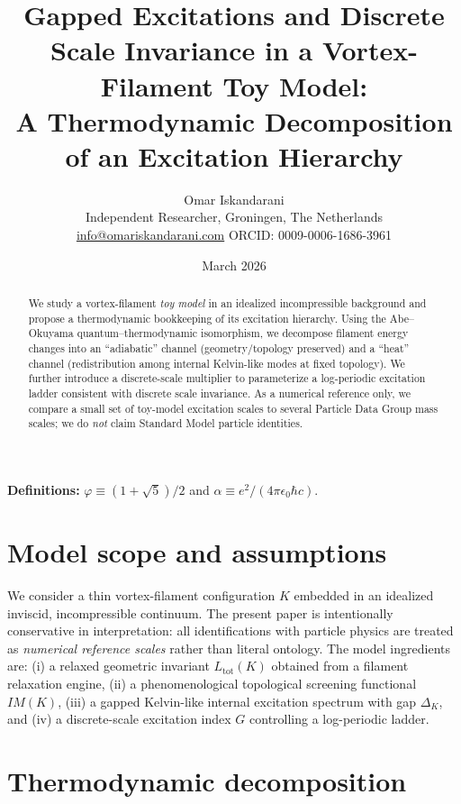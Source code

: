 \documentclass[11pt, a4paper]{article}
\title{\textbf{Gapped Excitations and Discrete Scale Invariance in a Vortex-Filament Toy Model:\\
A Thermodynamic Decomposition of an Excitation Hierarchy}}
\author{Omar Iskandarani\\ \small Independent Researcher, Groningen, The Netherlands\\
\small \href{mailto:info@omariskandarani.com}{info@omariskandarani.com} \quad ORCID: 0009-0006-1686-3961}
\date{March 2026}
\newcommand{\Ltot}{L_{\text{tot}}}
\newcommand{\goldenratio}{\varphi}
\newcommand{\alphafs}{\alpha}
\begin{document}
\maketitle

\noindent\textbf{Definitions:} $\goldenratio\equiv (1+\sqrt{5})/2$ and $\alphafs \equiv e^2/(4\pi\epsilon_0\hbar c)$.

\begin{abstract}
We study a vortex-filament \emph{toy model} in an idealized incompressible background and propose a thermodynamic bookkeeping of its excitation hierarchy.
Using the Abe--Okuyama quantum--thermodynamic isomorphism, we decompose filament energy changes into an ``adiabatic'' channel (geometry/topology preserved) and a ``heat'' channel (redistribution among internal Kelvin-like modes at fixed topology).
We further introduce a discrete-scale multiplier to parameterize a log-periodic excitation ladder consistent with discrete scale invariance.
As a numerical reference only, we compare a small set of toy-model excitation scales to several Particle Data Group mass scales; we do \emph{not} claim Standard Model particle identities.
\end{abstract}

\vspace{0.35cm}

\section{Model scope and assumptions}
\label{sec:scope}

We consider a thin vortex-filament configuration \(K\) embedded in an idealized inviscid, incompressible continuum.
The present paper is intentionally conservative in interpretation: all identifications with particle physics are treated as \emph{numerical reference scales} rather than literal ontology.
The model ingredients are:
(i) a relaxed geometric invariant \(\Ltot(K)\) obtained from a filament relaxation engine,
(ii) a phenomenological topological screening functional \(IM(K)\),
(iii) a gapped Kelvin-like internal excitation spectrum with gap \(\Delta_K\), and
(iv) a discrete-scale excitation index \(G\) controlling a log-periodic ladder.

\section{Thermodynamic decomposition}
\label{sec:thermo}
\end{document}
